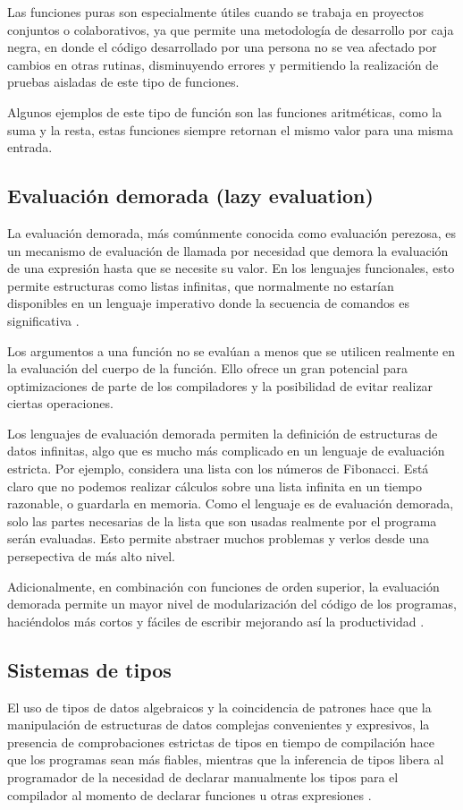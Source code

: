 Las funciones puras son especialmente útiles cuando se trabaja en proyectos conjuntos o colaborativos, ya que permite una metodología de desarrollo por caja negra, en donde el código desarrollado por una persona no se vea afectado por cambios en otras rutinas, disminuyendo errores y permitiendo la realización de pruebas aisladas de este tipo de funciones.

Algunos ejemplos de este tipo de función son las funciones aritméticas, como la suma y la resta, estas funciones siempre retornan el mismo valor para una misma entrada.

\subsection{Evaluación demorada (lazy evaluation)}

La evaluación demorada, más comúnmente conocida como evaluación perezosa, es un mecanismo de evaluación de llamada por necesidad que demora la evaluación de una expresión hasta que se necesite su valor. En los lenguajes funcionales, esto permite estructuras como listas infinitas, que normalmente no estarían disponibles en un lenguaje imperativo donde la secuencia de comandos es significativa  \cite{wiki:FunctionalProgramming}.

Los argumentos a una función no se evalúan a menos que se utilicen realmente en la evaluación del cuerpo de la función. Ello ofrece un gran potencial para optimizaciones de parte de los compiladores y la posibilidad de evitar realizar ciertas operaciones.

Los lenguajes de evaluación demorada permiten la definición de estructuras de datos infinitas, algo que es mucho más complicado en un lenguaje de evaluación estricta. Por ejemplo, considera una lista con los números de Fibonacci. Está claro que no podemos realizar cálculos sobre una lista infinita en un tiempo razonable, o guardarla en memoria. Como el lenguaje es de evaluación demorada, solo las partes necesarias de la lista que son usadas realmente por el programa serán evaluadas. Esto permite abstraer muchos problemas y verlos desde una persepectiva de más alto nivel.

Adicionalmente, en combinación con funciones de orden superior, la evaluación demorada permite un mayor nivel de modularización del código de los programas, haciéndolos más cortos y fáciles de escribir mejorando así la productividad \cite{hughes1989functional}.

\subsection{Sistemas de tipos}

El uso de tipos de datos algebraicos y la coincidencia de patrones hace que la manipulación de estructuras de datos complejas convenientes y expresivos, la presencia de comprobaciones estrictas de tipos en tiempo de compilación hace que los programas sean más fiables, mientras que la inferencia de tipos libera al programador de la necesidad de declarar manualmente los tipos para el compilador al momento de declarar funciones u otras expresiones \cite{wiki:FunctionalProgramming}.
